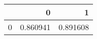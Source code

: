 \begin{tabular}{lrr}
\toprule
{} &         0 &         1 \\
\midrule
0 &  0.860941 &  0.891608 \\
\bottomrule
\end{tabular}
